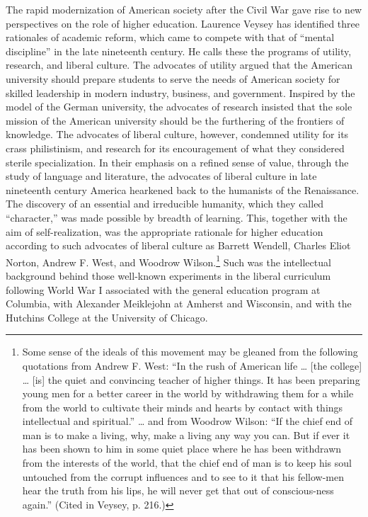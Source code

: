 The rapid modernization of American society after the Civil War gave rise to new perspectives on the role of higher education. Laurence Veysey has identified three rationales of academic reform, which came to compete with that of ``mental discipline'' in the late nineteenth century. He calls these the programs of utility, research, and liberal culture. The advocates of utility argued that the American university should prepare students to serve the needs of American society for skilled leadership in modern industry, business, and government. Inspired by the model of the German university, the advocates of research insisted that the sole mission of the American university should be the furthering of the frontiers of knowledge. The advocates of liberal culture, however, condemned utility for its crass philistinism, and research for its encouragement of what they considered sterile specialization. In their emphasis on a refined sense of value, through the study of language and literature, the advocates of liberal culture in late nineteenth century America hearkened back to the humanists of the Renaissance. The discovery of an essential and irreducible humanity, which they called ``character,'' was made possible by breadth of learning. This, together with the aim of self-realization, was the appropriate rationale for higher education according to such advocates of liberal culture as Barrett Wendell, Charles Eliot Norton, Andrew F. West, and Woodrow Wilson.\footnote{Some sense of the ideals of this movement may be gleaned from the following quotations from Andrew F. West: ``In the rush of American life \ldots{} [the college] \ldots{} [is] the quiet and convincing teacher of higher things. It has been preparing young men for a better career in the world by withdrawing them for a while from the world to cultivate their minds and hearts by contact with things intellectual and spiritual.'' \ldots{} and from Woodrow Wilson: ``If the chief end of man is to make a living, why, make a living any way you can. But if ever it has been shown to him in some quiet place where he has been withdrawn from the interests of the world, that the chief end of man is to keep his soul untouched from the corrupt influences and to see to it that his fellow-men hear the truth from his lips, he will never get that out of conscious-ness again.'' (Cited in Veysey, p. 216.)} Such was the intellectual background behind those well-known experiments in the liberal curriculum following World War I associated with the general education program at Columbia, with Alexander Meiklejohn at Amherst and Wisconsin, and with the Hutchins College at the University of Chicago. 


